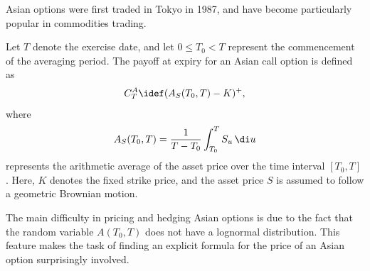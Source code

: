 Asian options were first traded in Tokyo in 1987, and have become particularly popular in commodities trading.

Let \(T\) denote the exercise date, and let \(0 \le T_0 < T\) represent the commencement of the averaging period. The payoff at expiry for an Asian call option is defined as
\begin{equation} \label{eq:AsianCallPayoff}
	C_T^A \idef (A_S(T_0, T) - K)^+,
\end{equation}
where
\begin{equation} \label{eq:ArithmeticAverage}
	A_S(T_0, T) = \frac{1}{T - T_0} \int_{T_0}^T S_u \, \di u
\end{equation}
represents the arithmetic average of the asset price over the time interval \([T_0, T]\). Here, \(K\) denotes the fixed strike price, and the asset price \(S\) is assumed to follow a geometric Brownian motion.

The main difficulty in pricing and hedging Asian options is due to the fact that the random variable \(A(T_0, T)\) does not have a lognormal distribution. This feature makes the task of finding an explicit formula for the price of an Asian option surprisingly involved.

